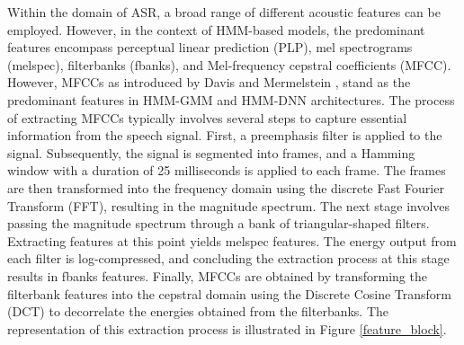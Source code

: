 Within the domain of ASR, a broad range of different acoustic features can be employed. However, in the context of HMM-based models, the predominant features encompass  perceptual linear prediction (PLP), mel spectrograms (melspec), filterbanks (fbanks), and Mel-frequency cepstral coefficients (MFCC). However, MFCCs as introduced by Davis and Mermelstein \cite{mfcc}, stand as the predominant features in HMM-GMM and HMM-DNN architectures.
The process of extracting MFCCs typically involves several steps to capture essential information from the speech signal. First, a preemphasis filter is applied to the signal. Subsequently, the signal is segmented into frames, and a Hamming window with a duration of 25 milliseconds is applied to each frame. The frames are then transformed into the frequency domain using the discrete Fast Fourier Transform (FFT), resulting in the magnitude spectrum.
The next stage involves passing the magnitude spectrum through a bank of triangular-shaped filters. Extracting features at this point yields melspec features. The energy output from each filter is log-compressed, and concluding the extraction process at this stage results in fbanks features. Finally, MFCCs are obtained by transforming the filterbank features into the cepstral domain using the Discrete Cosine Transform (DCT) to decorrelate the energies obtained from the filterbanks. The representation of this extraction process is illustrated in Figure \ref{feature_block}.


% 

